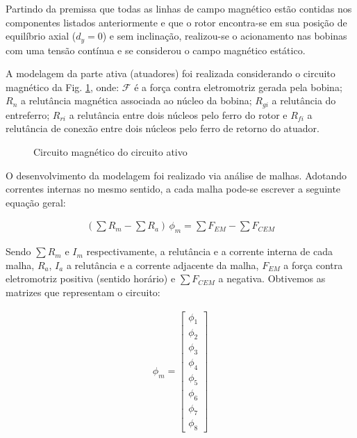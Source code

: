 Partindo da premissa que todas as linhas de campo magnético estão contidas nos componentes listados anteriormente e que o rotor encontra-se em sua posição de equilíbrio axial ($d_y = 0$) e sem inclinação, realizou-se o acionamento nas bobinas com uma tensão contínua e se considerou o campo magnético estático.


A modelagem da parte ativa (atuadores) foi realizada considerando o circuito magnético da Fig. \ref{Fig:modelagem:ativo:circuito2}, onde: $\mathcal{F}$ é a força contra eletromotriz gerada pela bobina; $R_n$ a relutância magnética associada ao núcleo da bobina; $R_{gi}$ a relutância do entreferro; $R_{ri}$ a relutância entre dois núcleos pelo ferro do rotor e $R_{fi}$ a relutância de conexão entre dois núcleos pelo ferro de retorno do atuador.

\begin{figure}[h!]
	
	\caption{Circuito magnético do circuito ativo}		\label{Fig:modelagem:ativo:circuito2}
\end{figure}

O desenvolvimento da modelagem foi realizado via análise de malhas. Adotando correntes internas no mesmo sentido, a cada malha pode-se escrever a seguinte equação geral:

\begin{align}
	(\sum R_m  - \sum  R_a ) \, \phi_m = \sum F_{EM} - \sum F_{CEM}
\end{align}

Sendo $\sum R_m$ e $I_m$  respectivamente, a relutância e a corrente interna de cada malha, $R_a$, $I_{a}$ a relutância e a corrente adjacente da malha, $F_{EM}$ a força contra eletromotriz positiva (sentido horário) e $\sum F_{CEM}$ a negativa. Obtivemos as matrizes que representam o circuito:

\begin{align}
	\phi_m = 
	\begin{bmatrix}
	\phi_1 \\ \phi_2 \\  \phi_3 \\  \phi_4 \\  \phi_5 \\  \phi_6 \\  \phi_7 \\  \phi_8
	\end{bmatrix}
\end{align}

